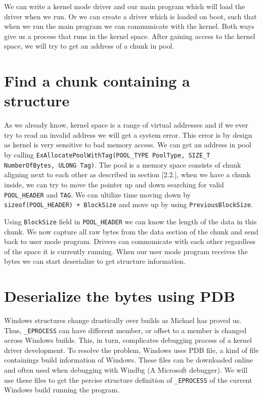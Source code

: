 
We can write a kernel mode driver and our main program which will load the driver when we run. Or we can create a driver which is loaded on boot, such that when we run the main program we can communicate with the kernel. Both ways give us a process that runs in the kernel space. After gaining access to the kernel space, we will try to get an address of a chunk in pool.

\section[Find a chunk containing a structure]{Find a chunk containing a structure}

As we already know, kernel space is a range of virtual addresses and if we ever try to read an invalid address we will get a system error. This error is by design as kernel is very sensitive to bad memory access. We can get an address in pool by calling \texttt{ExAllocatePoolWithTag(POOL\_TYPE PoolType, SIZE\_T NumberOfBytes, ULONG Tag)}. The pool is a memory space consists of chunk aligning next to each other as described in section [2.2.], when we have a chunk inside, we can try to move the pointer up and down searching for valid \texttt{POOL\_HEADER} and \texttt{TAG}. We can ultilize time moving down by \texttt{sizeof(POOL\_HEADER) + BlockSize} and move up by using \texttt{PreviousBlockSize}.

Using \texttt{BlockSize} field in \texttt{POOL\_HEADER} we can know the length of the data in this chunk. We now capture all raw bytes from the data section of the chunk and send back to user mode program. Drivers can communicate with each other regardless of the space it is currently running. When our user mode program receives the bytes we can start deserialize to get structure information.

\section[Deserialize the bytes using PDB]{Deserialize the bytes using PDB}

Windows structures change drastically over builds as Michael \cite{windowsKernelCharacterization} has proved us. Thus, \texttt{\_EPROCESS} can have different member, or offset to a member is changed across Windows builds. This, in turn, complicates debugging process of a kernel driver development. To resolve the problem, Windows uses PDB file, a kind of file containings build information of Windows. These files can be downloaded online and often used when debugging with Windbg (A Microsoft debugger). We will use these files to get the percise structure definition of \texttt{\_EPROCESS} of the current Windows build running the program.

